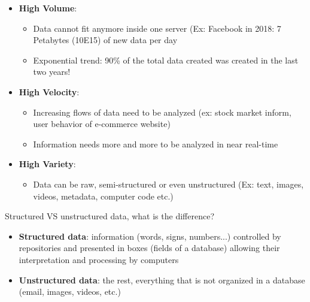 \documentclass{beamer}[10pt, usepdftitle=false handout]
\begin{document}
	\begin{frame}
	
	\begin{itemize}

	\item{\textbf{High Volume}:
		\begin{itemize}
		\item{Data cannot fit anymore inside one server (Ex: Facebook in 2018: 7 Petabytes (10E15) of new data per day}
		\item{Exponential trend: 90\% of the total data created was created in the last two years!}		
				
		\end{itemize}
		}	
	\item{\textbf{High Velocity}:
		\begin{itemize}
			\item{Increasing flows of data need to be analyzed  (ex: stock market inform, user behavior of e-commerce website)}
			\item{Information needs more and more to be analyzed in near real-time}		
		\end{itemize}			
	
	}
	
	\item{\textbf{High Variety}:
	
	\begin{itemize}
		\item{Data can be raw, semi-structured or even unstructured (Ex: text, images, videos, metadata, computer code etc.)}	
	\end{itemize}
	
	}	
	\end{itemize}		
	
	
	\end{frame}	
	
	\begin{frame}
	
	Structured VS unstructured data, what is the difference?
	\vspace*{0.6em}
	
	\begin{itemize}
		\item{\textbf{Structured data}: information (words, signs, numbers...) controlled by repositories and presented in boxes (fields of a database) allowing their interpretation and processing by computers}
		
		\item{\textbf{Unstructured data}: the rest, everything that is not organized in a database (email, images, videos, etc.)}	
	\end{itemize}		
	

		
	\end{frame}	
	
\end{document}
